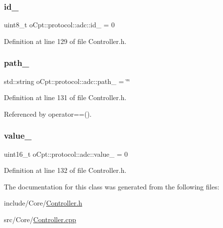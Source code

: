\subsubsection{\texorpdfstring{id\+\_\+}{id\_}}
{\footnotesize\ttfamily uint8\+\_\+t o\+Cpt\+::protocol\+::adc\+::id\+\_\+ = 0\hspace{0.3cm}{\ttfamily [private]}}



Definition at line 129 of file Controller.\+h.

\hypertarget{classo_cpt_1_1protocol_1_1adc_a23481c789dd95444a3e9a19beb5b044e}{}\label{classo_cpt_1_1protocol_1_1adc_a23481c789dd95444a3e9a19beb5b044e} 
\subsubsection{\texorpdfstring{path\+\_\+}{path\_}}
{\footnotesize\ttfamily std\+::string o\+Cpt\+::protocol\+::adc\+::path\+\_\+ = \char`\"{}\char`\"{}\hspace{0.3cm}{\ttfamily [private]}}



Definition at line 131 of file Controller.\+h.



Referenced by operator==().

\hypertarget{classo_cpt_1_1protocol_1_1adc_a79ed77ed852cbe9c1b23e9c3601ffdb7}{}\label{classo_cpt_1_1protocol_1_1adc_a79ed77ed852cbe9c1b23e9c3601ffdb7} 
\subsubsection{\texorpdfstring{value\+\_\+}{value\_}}
{\footnotesize\ttfamily uint16\+\_\+t o\+Cpt\+::protocol\+::adc\+::value\+\_\+ = 0\hspace{0.3cm}{\ttfamily [private]}}



Definition at line 132 of file Controller.\+h.



The documentation for this class was generated from the following files\+:\begin{DoxyCompactItemize}
\item 
include/\+Core/\hyperlink{_controller_8h}{Controller.\+h}\item 
src/\+Core/\hyperlink{_controller_8cpp}{Controller.\+cpp}\end{DoxyCompactItemize}
